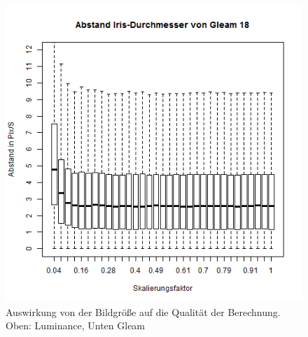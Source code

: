 \begin{figure}
	\includegraphics[width=0.32\linewidth]{Eye_Img_Box/Gleam_Radius_I_18}
	\caption{Auswirkung von der Bildgröße auf die Qualität der Berechnung.\\ Oben: Luminance, Unten Gleam}
	\label{ElSe_scall}
\end{figure}
